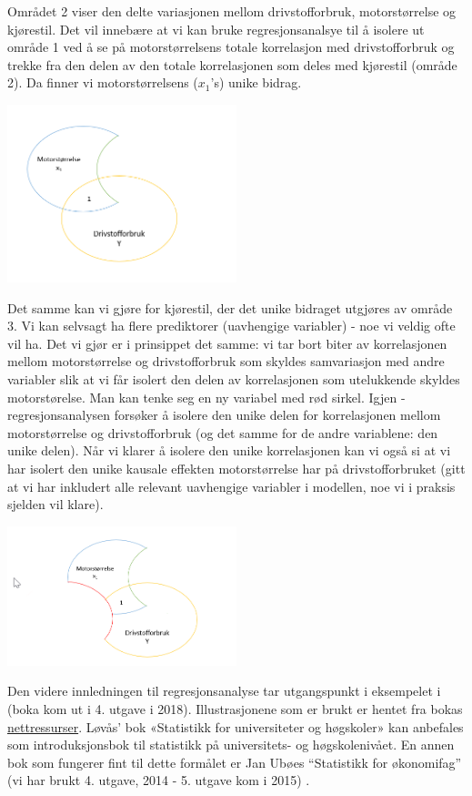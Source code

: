 \documentclass[
]{article}
\begin{document}
Området 2 viser den delte variasjonen mellom drivstofforbruk, motorstørrelse og kjørestil. Det vil innebære at vi kan bruke regresjonsanalsye til å isolere ut område 1 ved å se på motorstørrelsens totale korrelasjon med drivstofforbruk og trekke fra den delen av den totale korrelasjonen som deles med kjørestil (område 2). Da finner vi motorstørrelsens (\(x_1\)'s) unike bidrag.

\includegraphics[width=0.5\textwidth,height=\textheight]{Venn3.png}

Det samme kan vi gjøre for kjørestil, der det unike bidraget utgjøres av område 3. Vi kan selvsagt ha flere prediktorer (uavhengige variabler) - noe vi veldig ofte vil ha. Det vi gjør er i prinsippet det samme: vi tar bort biter av korrelasjonen mellom motorstørrelse og drivstofforbruk som skyldes samvariasjon med andre variabler slik at vi får isolert den delen av korrelasjonen som utelukkende skyldes motorstørelse. Man kan tenke seg en ny variabel med rød sirkel. Igjen - regresjonsanalysen forsøker å isolere den unike delen for korrelasjonen mellom motorstørrelse og drivstofforbruk (og det samme for de andre variablene: den unike delen). Når vi klarer å isolere den unike korrelasjonen kan vi også si at vi har isolert den unike kausale effekten motorstørrelse har på drivstofforbruket (gitt at vi har inkludert alle relevant uavhengige variabler i modellen, noe vi i praksis sjelden vil klare).

\includegraphics[width=0.5\textwidth,height=\textheight]{Venn5.png}

Den videre innledningen til regresjonsanalyse tar utgangspunkt i eksempelet i \citet{lovasStatistikkUniversiteterOg2013} (boka kom ut i 4. utgave i 2018). Illustrasjonene som er brukt er hentet fra bokas \href{www.nettressurser.no/statistikk}{nettressurser}. Løvås' bok «Statistikk for universiteter og høgskoler» kan anbefales som introduksjonsbok til statistikk på universitets- og høgskolenivået. En annen bok som fungerer fint til dette formålet er Jan Ubøes ``Statistikk for økonomifag'' (vi har brukt 4. utgave, 2014 - 5. utgave kom i 2015) \citep{uboeStatistikkOkonomifag2014}.
\end{document}
